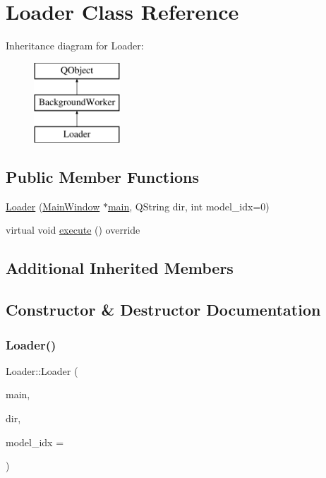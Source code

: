 \hypertarget{class_loader}{}\section{Loader Class Reference}
\label{class_loader}
Inheritance diagram for Loader\+:\begin{figure}[H]
\begin{center}
\leavevmode
\includegraphics[height=3.000000cm]{d9/d42/class_loader}
\end{center}
\end{figure}
\subsection*{Public Member Functions}
\begin{DoxyCompactItemize}
\item 
\mbox{\hyperlink{class_loader_a8ee45d69a77ca7bd6b84d18b10812c91}{Loader}} (\mbox{\hyperlink{class_main_window}{Main\+Window}} $\ast$\mbox{\hyperlink{tseditor_8cpp_a0ddf1224851353fc92bfbff6f499fa97}{main}}, Q\+String dir, int model\+\_\+idx=0)
\item 
virtual void \mbox{\hyperlink{class_loader_abdb17a0ee918aa7b19d53b9c909cfb60}{execute}} () override
\end{DoxyCompactItemize}
\subsection*{Additional Inherited Members}


\subsection{Constructor \& Destructor Documentation}
\mbox{\label{class_loader_a8ee45d69a77ca7bd6b84d18b10812c91}} 
\subsubsection{\texorpdfstring{Loader()}{Loader()}}
{\footnotesize\ttfamily Loader\+::\+Loader (\begin{DoxyParamCaption}\item[{\mbox{\hyperlink{class_main_window}{Main\+Window}} $\ast$}]{main,  }\item[{Q\+String}]{dir,  }\item[{int}]{model\+\_\+idx = {} }\end{DoxyParamCaption})\hspace{0.3cm}{\ttfamily [inline]}}



